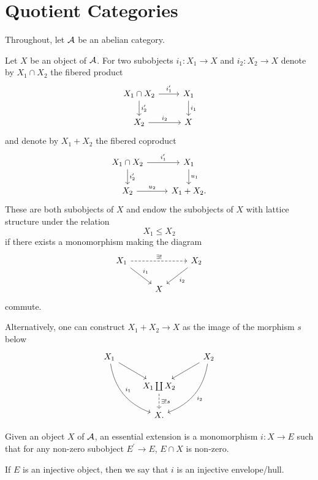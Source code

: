 \documentclass[dissertation.tex]{subfiles}
\begin{document}
\section{Quotient Categories}
Throughout, let $\mathcal{A}$ be an abelian category.

\begin{defn}
  Let $X$ be an object of $\mathcal{A}$.
  For two subobjects $i_1 \colon X_1 \rightarrow X$ and $i_2 \colon X_2 \rightarrow X$ denote by $X_1 \cap X_2$ the fibered product
  $$\begin{tikzcd}
    X_1 \cap X_2 \arrow{d}{i_2^\prime}\arrow{r}{i_1^\prime} & X_1\arrow{d}{i_1}\\
    X_2 \arrow{r}{i_2} & X
  \end{tikzcd}$$
  and denote by $X_1 + X_2$ the fibered coproduct 
  $$\begin{tikzcd}
    X_1 \cap X_2 \arrow{r}{i_1^\prime} \arrow{d}{i_2^\prime} & X_1\arrow{d}{u_1}\\
    X_2 \arrow{r}{u_2} & X_1 + X_2.
  \end{tikzcd}$$
  These are both subobjects of $X$ and endow the subobjects of $X$ with lattice structure under the relation
  $$X_1 \leq X_2$$
  if there exists a monomorphism making the diagram
  $$\begin{tikzcd}
    X_1\arrow{rd}{i_1}\arrow[dashed]{rr}{\exists !} & & X_2 \arrow{ld}{i_2}\\
    & X &
  \end{tikzcd}$$
  commute.
\end{defn}

\begin{rmk}
  Alternatively, one can construct $X_1 + X_2 \rightarrow X$ as the image of the morphism $s$ below
  $$\begin{tikzcd}
    X_1\arrow[bend right]{rdd}{i_1}\arrow{rd} & & X_2 \arrow{ld} \arrow[bend left]{ldd}{i_2}\\
    & X_1 \coprod X_2\arrow[dashed]{d}{\exists !s} &\\
    & X. &
  \end{tikzcd}$$
\end{rmk}

\begin{defn}
  Given an object $X$ of $\mathcal{A}$, an essential extension is a monomorphism $i \colon X \rightarrow E$ such that for any non-zero subobject $E^\prime \rightarrow E$, $E \cap X$ is non-zero.
  
  If $E$ is an injective object, then we say that $i$ is an injective envelope/hull.
\end{defn}
\end{document}
